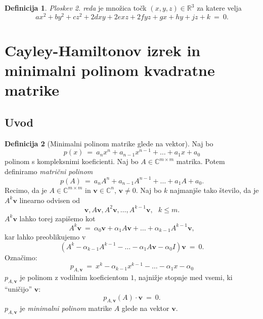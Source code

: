 \documentclass[11pt]{article}
\newcommand{\R}{\mathbb{R}}
\newcommand{\vv}{\mathbf{v}}
\newcommand{\0}{\mathbf{0}}
\theoremstyle{definition}
\newtheorem{definicija}{Definicija}[section]
\theoremstyle{definition}
\theoremstyle{definition}
\theoremstyle{definition}
\begin{document}
\begin{definicija}

\textit{Ploskev 2. reda} je množica točk $(x,y,z) \in \R^3$ za katere velja
$$ax^2  + by^2 + cz^2+ 2dxy + 2exz+ 2fyz + gx + hy + jz + k ~=~ 0.$$

\end{definicija}
\vspace{0.5cm}


\pagebreak


\section{Cayley-Hamiltonov izrek in \\minimalni polinom kvadratne matrike}
\vspace{0.5cm}


\subsection{Uvod}
\vspace{0.5cm}

\begin{definicija}[Minimalni polinom matrike glede na vektor]

Naj bo 
$$p(x) ~=~ a_n x^n + a_{n-1} x^{n-1} + \ldots + a_1 x + a_0$$
polinom s kompleksnimi koeficienti. Naj bo $A \in \mathbb{C}^{m \times m}$ matrika. Potem definiramo \textit{matrični polinom}
$$p(A) ~=~ a_n A^n + a_{n-1} A^{n-1} + \ldots + a_1 A + a_0.$$
Recimo, da je $A \in \mathbb{C}^{m \times m}$ in $\vv \in \mathbb{C}^n$, $\vv \neq 0$. Naj bo $k$ najmanjše tako število, da je $A^k\vv$ linearno odvisen od 
$$\vv, A\vv, A^2\vv, \ldots, A^{k-1}\vv, ~~~k \leq m.$$
$A^k\vv$ lahko torej zapišemo kot 
$$A^k\vv ~=~ \alpha_0 \vv + \alpha_1 A\vv + \ldots + \alpha_{k-1} A^{k-1} \vv,$$
kar lahko preoblikujemo v 
$$(A^k - \alpha_{k-1} A^{k-1} - \ldots - \alpha_1 A\vv - \alpha_0 I)\vv ~=~ 0.$$
Označimo:
$$p_{A,\vv} ~=~ x^k - \alpha_{k-1} x^{k-1} - \ldots - \alpha_1 x - \alpha_0$$
$p_{A,\vv}$ je polinom z vodilnim koeficientom $1$, najnižje stopnje med vsemi, ki ``uničijo'' $\vv$:
$$p_{A,\vv}(A) \cdot \vv ~=~ 0.$$
$p_{A,\vv}$ je \textit{minimalni polinom} matrike $A$ glede na vektor $\vv$.

\end{definicija}
\vspace{0.5cm}
\end{document}

